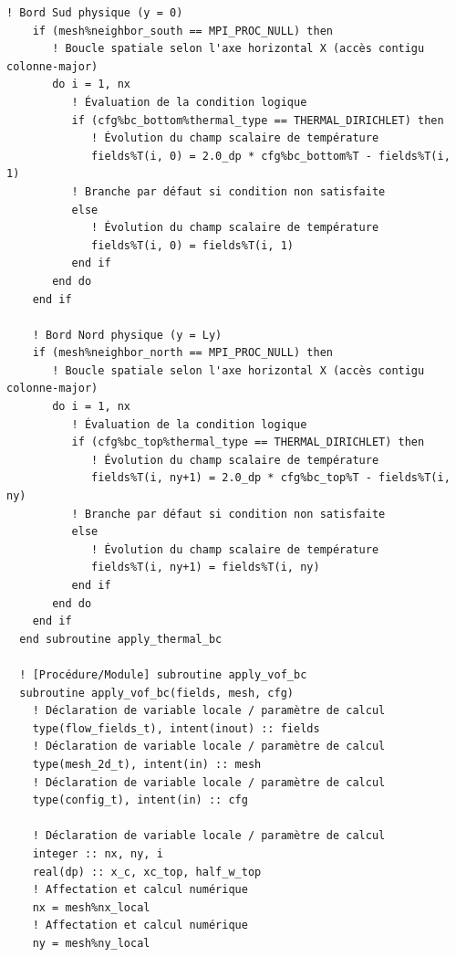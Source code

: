 \documentclass[10pt,a4paper,oneside]{book}
\begin{document}
\begin{lstlisting}[language={[95]Fortran}]
    ! Bord Sud physique (y = 0)
    if (mesh%neighbor_south == MPI_PROC_NULL) then
       ! Boucle spatiale selon l'axe horizontal X (accès contigu colonne-major)
       do i = 1, nx
          ! Évaluation de la condition logique
          if (cfg%bc_bottom%thermal_type == THERMAL_DIRICHLET) then
             ! Évolution du champ scalaire de température
             fields%T(i, 0) = 2.0_dp * cfg%bc_bottom%T - fields%T(i, 1)
          ! Branche par défaut si condition non satisfaite
          else
             ! Évolution du champ scalaire de température
             fields%T(i, 0) = fields%T(i, 1)
          end if
       end do
    end if

    ! Bord Nord physique (y = Ly)
    if (mesh%neighbor_north == MPI_PROC_NULL) then
       ! Boucle spatiale selon l'axe horizontal X (accès contigu colonne-major)
       do i = 1, nx
          ! Évaluation de la condition logique
          if (cfg%bc_top%thermal_type == THERMAL_DIRICHLET) then
             ! Évolution du champ scalaire de température
             fields%T(i, ny+1) = 2.0_dp * cfg%bc_top%T - fields%T(i, ny)
          ! Branche par défaut si condition non satisfaite
          else
             ! Évolution du champ scalaire de température
             fields%T(i, ny+1) = fields%T(i, ny)
          end if
       end do
    end if
  end subroutine apply_thermal_bc

  ! [Procédure/Module] subroutine apply_vof_bc
  subroutine apply_vof_bc(fields, mesh, cfg)
    ! Déclaration de variable locale / paramètre de calcul
    type(flow_fields_t), intent(inout) :: fields
    ! Déclaration de variable locale / paramètre de calcul
    type(mesh_2d_t), intent(in) :: mesh
    ! Déclaration de variable locale / paramètre de calcul
    type(config_t), intent(in) :: cfg

    ! Déclaration de variable locale / paramètre de calcul
    integer :: nx, ny, i
    real(dp) :: x_c, xc_top, half_w_top
    ! Affectation et calcul numérique
    nx = mesh%nx_local
    ! Affectation et calcul numérique
    ny = mesh%ny_local


\end{lstlisting}
\end{document}
